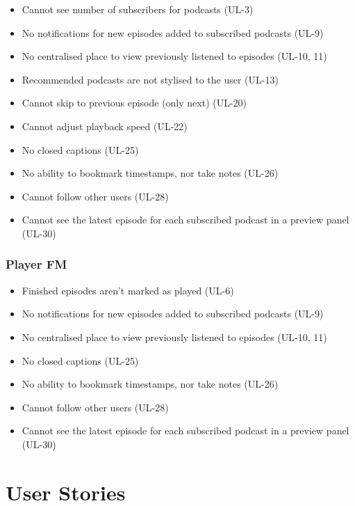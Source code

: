 \documentclass[12pt]{article}
\begin{document}
    \begin{itemize}
        \item Cannot see number of subscribers for podcasts (UL-3)
        \item No notifications for new episodes added to subscribed podcasts (UL-9)
        \item No centralised place to view previously listened to episodes (UL-10, 11)
        \item Recommended podcasts are not stylised to the user (UL-13)
        \item Cannot skip to previous episode (only next) (UL-20)
        \item Cannot adjust playback speed (UL-22)
        \item No closed captions (UL-25)
        \item No ability to bookmark timestamps, nor take notes (UL-26)
        \item Cannot follow other users (UL-28)
        \item Cannot see the latest episode for each subscribed podcast in a preview panel (UL-30)
    \end{itemize}

    \subsubsection{Player FM\cite{player_fm}}
    \begin{itemize}
        \item Finished episodes aren’t marked as played (UL-6)
        \item No notifications for new episodes added to subscribed podcasts (UL-9)
        \item No centralised place to view previously listened to episodes (UL-10, 11)
        \item No closed captions (UL-25)
        \item No ability to bookmark timestamps, nor take notes (UL-26)
        \item Cannot follow other users (UL-28)
        \item Cannot see the latest episode for each subscribed podcast in a preview panel (UL-30)
    \end{itemize}

\fi


\newpage
\section{User Stories}
\end{document}
